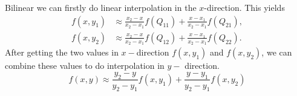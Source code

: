 \documentclass{beamer}
\begin{document}
\begin{frame}{Bilinear}
we can firstly do linear interpolation in the $x$-direction. This yields
\pause
\begin{subequations}
        \begin{align}
            f(x,y_{1})&\approx {\frac {x_{2}-x}{x_{2}-x_{1}}}f(Q_{11})+{\frac {x-x_{1}}{x_{2}-x_{1}}}f(Q_{21}),\\
            f(x,y_{2})&\approx {\frac {x_{2}-x}{x_{2}-x_{1}}}f(Q_{12})+{\frac {x-x_{1}}{x_{2}-x_{1}}}f(Q_{22}).
        \end{align}
        \label{eq:2}
\end{subequations}
\pause
After getting the two values in $x-$direction $f(x, y_1)$ and $f(x, y_2)$, we can combine these values to do interpolation in $y-$ direction.
\pause
\begin{equation}
        f(x,y) \approx {\frac {y_{2}-y}{y_{2}-y_{1}}}f(x,y_{1})+{\frac {y-y_{1}}{y_{2}-y_{1}}}f(x,y_{2})
    \end{equation}
\end{frame}
\end{document}
